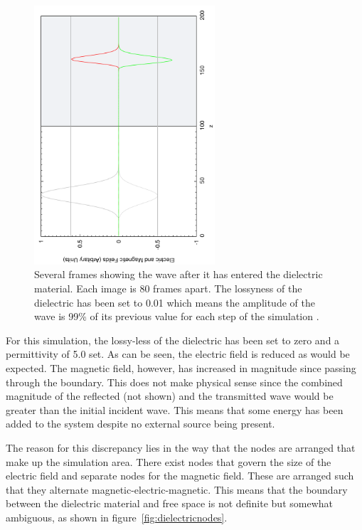 \begin{figure}[ht]
    \centering
    \includegraphics[angle=270, width=0.6\textwidth]{magneticgain.pdf}
    \caption{Several frames showing the wave after it has entered the dielectric material. Each image is 80 frames apart. The lossyness of the dielectric has been set to 0.01 which means the amplitude of the wave is 99\% of its previous value for each step of the simulation .}\label{fig:magneticgain}
\end{figure}

For this simulation, the lossy-less of the dielectric has been set to zero and a permittivity of 5.0 set. As can be seen, the electric field is reduced as would be expected. The magnetic field, however, has increased in magnitude since passing through the boundary. This does not make physical sense since the combined magnitude of the reflected (not shown) and the transmitted wave would be greater than the initial incident wave. This means that some energy has been added to the system despite no external source being present.

The reason for this discrepancy lies in the way that the nodes are arranged that make up the simulation area. There exist nodes that govern the size of the electric field and separate nodes for the magnetic field. These are arranged such that they alternate magnetic-electric-magnetic. This means that the boundary between the dielectric material and free space is not definite but somewhat ambiguous, as shown in figure~\ref{fig:dielectricnodes}.

